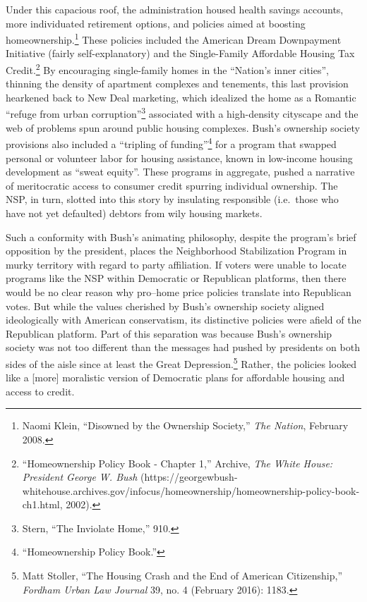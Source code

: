\documentclass[12pt,oneside]{psthesis}
\begin{document}
Under this capacious roof, the administration housed health savings accounts, more individuated retirement options, and policies aimed at boosting homeownership.\footnote{Naomi Klein, ``Disowned by the Ownership Society,'' \emph{The Nation}, February 2008.}
These policies included the American Dream Downpayment Initiative (fairly self-explanatory) and the Single-Family Affordable Housing Tax Credit.\footnote{``Homeownership Policy Book - Chapter 1,'' Archive, \emph{The White House: President George W. Bush} (https://georgewbush-whitehouse.archives.gov/infocus/homeownership/homeownership-policy-book-ch1.html, 2002).}
By encouraging single-family homes in the ``Nation's inner cities'', thinning the density of apartment complexes and tenements, this last provision hearkened back to New Deal marketing, which idealized the home as a Romantic ``refuge from urban corruption''\footnote{Stern, ``The Inviolate Home,'' 910.} associated with a high-density cityscape and the web of problems spun around public housing complexes.
Bush's ownership society provisions also included a ``tripling of funding''\footnote{``Homeownership Policy Book.''} for a program that swapped personal or volunteer labor for housing assistance, known in low-income housing development as ``sweat equity''.
These programs in aggregate, pushed a narrative of meritocratic access to consumer credit spurring individual ownership.
The NSP, in turn, slotted into this story by insulating responsible (i.e.~those who have not yet defaulted) debtors from wily housing markets.

Such a conformity with Bush's animating philosophy, despite the program's brief opposition by the president, places the Neighborhood Stabilization Program in murky territory with regard to party affiliation.
If voters were unable to locate programs like the NSP within Democratic or Republican platforms, then there would be no clear reason why pro--home price policies translate into Republican votes.
But while the values cherished by Bush's ownership society aligned ideologically with American conservatism, its distinctive policies were afield of the Republican platform.
Part of this separation was because Bush's ownership society was not too different than the messages had pushed by presidents on both sides of the aisle since at least the Great Depression.\footnote{Matt Stoller, ``The Housing Crash and the End of American Citizenship,'' \emph{Fordham Urban Law Journal} 39, no. 4 (February 2016): 1183.}
Rather, the policies looked like a {[}more{]} moralistic version of Democratic plans for affordable housing and access to credit.
\end{document}
